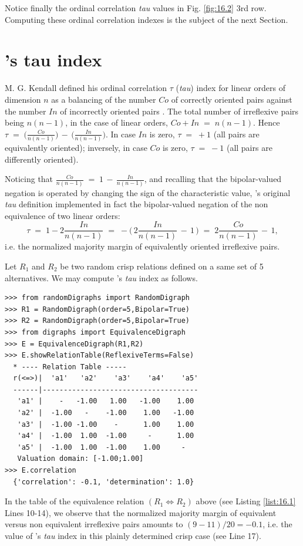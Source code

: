 Notice finally the ordinal correlation \emph{tau} values in Fig. \ref{fig:16.2} 3rd row. Computing these ordinal correlation indexes is the subject of the next Section.
 
\section{\Kendall 's tau index}
\label{sec:16:6}


M. G. Kendall defined his ordinal correlation $\tau$ (\emph{tau}) index for linear orders of dimension $n$ as a balancing of the number $Co$ of correctly oriented pairs against the number $In$ of incorrectly oriented pairs \citep{KEN-1938}. The total number of irreflexive pairs being $n(n-1)$, in the case of linear orders, $Co + In \;=\; n(n-1)$.  Hence $\tau \;=\; \big(\frac{Co}{n(n-1)}\big) \,-\, \big(\frac{In}{n(n-1)}\big)$. In case $In$ is zero, $\tau \;=\; +1$  (all pairs are equivalently oriented); inversely, in case $Co$ is zero, $\tau \;=\; -1$ (all pairs are differently oriented).

Noticing that $\frac{Co}{n(n-1)} \;=\; 1 \,-\, \frac{In}{n(n-1)}$, and recalling that the bipolar-valued negation is operated by changing the sign of the characteristic value, \Kendall 's original \emph{tau} definition implemented in fact the bipolar-valued negation of the non equivalence of two linear orders: 
\begin{equation}
      \tau \;=\; 1 -2\frac{In}{n(n-1)} \;=\; -\big(\,2\frac{In}{n(n-1)} \,-\, 1\,\big) \;=\; 2\frac{Co}{n(n-1)} \,-\, 1,
\end{equation} 
i.e. the normalized majority margin of equivalently oriented irreflexive pairs.

Let $R_1$ and $R_2$ be two random crisp relations defined on a same set of 5 alternatives. We may compute \Kendall 's \emph{tau} index as follows.

\begin{lstlisting}[caption={Computing a relational equivalence digraph},label=list:16.1]
>>> from randomDigraphs import RandomDigraph
>>> R1 = RandomDigraph(order=5,Bipolar=True)
>>> R2 = RandomDigraph(order=5,Bipolar=True)
>>> from digraphs import EquivalenceDigraph
>>> E = EquivalenceDigraph(R1,R2)
>>> E.showRelationTable(ReflexiveTerms=False)
  * ---- Relation Table -----
  r(<=>)|  'a1'	  'a2'	  'a3'	  'a4'	  'a5'	  
  ------|-------------------------------------
   'a1' |    -   -1.00   1.00   -1.00    1.00	 
   'a2' |  -1.00   -    -1.00    1.00   -1.00	 
   'a3' |  -1.00 -1.00    -      1.00    1.00	 
   'a4' |  -1.00  1.00  -1.00     -      1.00	 
   'a5' |  -1.00  1.00  -1.00    1.00     - 	 
   Valuation domain: [-1.00;1.00]
>>> E.correlation
  {'correlation': -0.1, 'determination': 1.0}
\end{lstlisting}
In the table of the equivalence relation $(R_1 \Leftrightarrow R_2)$ above (see Listing \ref{list:16.1} Lines 10-14), we observe that the normalized majority margin of equivalent versus non equivalent irreflexive pairs amounts to $(9 - 11)/20 = -0.1$, i.e. the value of \Kendall 's \emph{tau} index in this plainly determined crisp case (see Line 17).

